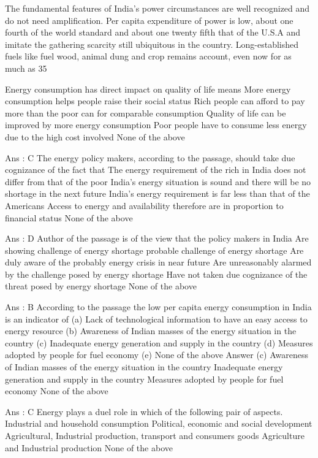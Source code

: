 The fundamental features of India’s power circumstances are well recognized and do not need amplification. Per capita expenditure of power is low, about one fourth of the world standard and about one twenty fifth that of the U.S.A and imitate the gathering scarcity still ubiquitous in the country. Long-established fuels like fuel wood, animal dung and crop remains account, even now for as much as 35%

    Energy consumption has direct impact on quality of life means
        More energy consumption helps people raise their social status
        Rich people can afford to pay more than the poor can for comparable consumption
        Quality of life can be improved by more energy consumption
        Poor people have to consume less energy due to the high cost involved
        None of the above 

    Ans : C
    The energy policy makers, according to the passage, should take due cognizance of the fact that
        The energy requirement of the rich in India does not differ from that of the poor
        India’s energy situation is sound and there will be no shortage in the next future
        India’s energy requirement is far less than that of the Americans
        Access to energy and availability therefore are in proportion to financial status
        None of the above 

    Ans : D
    Author of the passage is of the view that the policy makers in India
        Are showing challenge of energy shortage probable challenge of energy shortage
        Are duly aware of the probably energy crisis in near future
        Are unreasonably alarmed by the challenge posed by energy shortage
        Have not taken due cognizance of the threat posed by energy shortage
        None of the above 

    Ans : B
    According to the passage the low per capita energy consumption in India is an indicator of
        (a) Lack of technological information to have an easy access to energy resource (b) Awareness of Indian masses of the energy situation in the country (c) Inadequate energy generation and supply in the country (d) Measures adopted by people for fuel economy (e) None of the above Answer (c)
        Awareness of Indian masses of the energy situation in the country
        Inadequate energy generation and supply in the country
        Measures adopted by people for fuel economy
        None of the above 

    Ans : C
    Energy plays a duel role in which of the following pair of aspects.
        Industrial and household consumption
        Political, economic and social development
        Agricultural, Industrial production, transport and consumers goods
        Agriculture and Industrial production
        None of the above 

